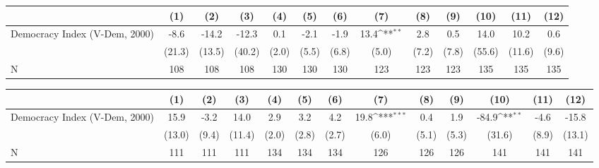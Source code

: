{
\def\sym#1{\ifmmode^{#1}\else\(^{#1}\)\fi}
\begin{tabular}{l*{12}{c}}
\hline\hline
                    &\multicolumn{1}{c}{(1)}         &\multicolumn{1}{c}{(2)}         &\multicolumn{1}{c}{(3)}         &\multicolumn{1}{c}{(4)}         &\multicolumn{1}{c}{(5)}         &\multicolumn{1}{c}{(6)}         &\multicolumn{1}{c}{(7)}         &\multicolumn{1}{c}{(8)}         &\multicolumn{1}{c}{(9)}         &\multicolumn{1}{c}{(10)}         &\multicolumn{1}{c}{(11)}         &\multicolumn{1}{c}{(12)}         \\
\hline
Democracy Index (V-Dem, 2000)&        -8.6         &       -14.2         &       -12.3         &         0.1         &        -2.1         &        -1.9         &        13.4\sym{**} &         2.8         &         0.5         &        14.0         &        10.2         &         0.6         \\
                    &      (21.3)         &      (13.5)         &      (40.2)         &       (2.0)         &       (5.5)         &       (6.8)         &       (5.0)         &       (7.2)         &       (7.8)         &      (55.6)         &      (11.6)         &       (9.6)         \\
\hline
N                   &         108         &         108         &         108         &         130         &         130         &         130         &         123         &         123         &         123         &         135         &         135         &         135         \\
\hline\hline
\end{tabular}
}
{
\def\sym#1{\ifmmode^{#1}\else\(^{#1}\)\fi}
\begin{tabular}{l*{12}{c}}
\hline\hline
                    &\multicolumn{1}{c}{(1)}         &\multicolumn{1}{c}{(2)}         &\multicolumn{1}{c}{(3)}         &\multicolumn{1}{c}{(4)}         &\multicolumn{1}{c}{(5)}         &\multicolumn{1}{c}{(6)}         &\multicolumn{1}{c}{(7)}         &\multicolumn{1}{c}{(8)}         &\multicolumn{1}{c}{(9)}         &\multicolumn{1}{c}{(10)}         &\multicolumn{1}{c}{(11)}         &\multicolumn{1}{c}{(12)}         \\
\hline
Democracy Index (V-Dem, 2000)&        15.9         &        -3.2         &        14.0         &         2.9         &         3.2         &         4.2         &        19.8\sym{***}&         0.4         &         1.9         &       -84.9\sym{**} &        -4.6         &       -15.8         \\
                    &      (13.0)         &       (9.4)         &      (11.4)         &       (2.0)         &       (2.8)         &       (2.7)         &       (6.0)         &       (5.1)         &       (5.3)         &      (31.6)         &       (8.9)         &      (13.1)         \\
\hline
N                   &         111         &         111         &         111         &         134         &         134         &         134         &         126         &         126         &         126         &         141         &         141         &         141         \\
\hline\hline
\end{tabular}
}
